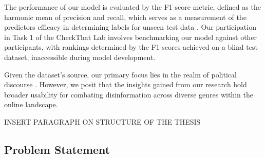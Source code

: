 
The performance of our model is evaluated by the F1 score metric, defined as the harmonic mean of precision and recall, which serves as a measurement of the predictors efficacy in determining labels for unseen test data \cite{f1_score}. Our participation in Task 1 of the CheckThat Lab involves benchmarking our model against other participants, with rankings determined by the F1 scores achieved on a blind test dataset, inaccessible during model development.

Given the dataset's source, our primary focus lies in the realm of political discourse \cite{claimbuster_arslan}. However, we posit that the insights gained from our research hold broader usability for combating disinformation across diverse genres within the online landscape.

INSERT PARAGRAPH ON STRUCTURE OF THE THESIS
\subsection{Problem Statement}

